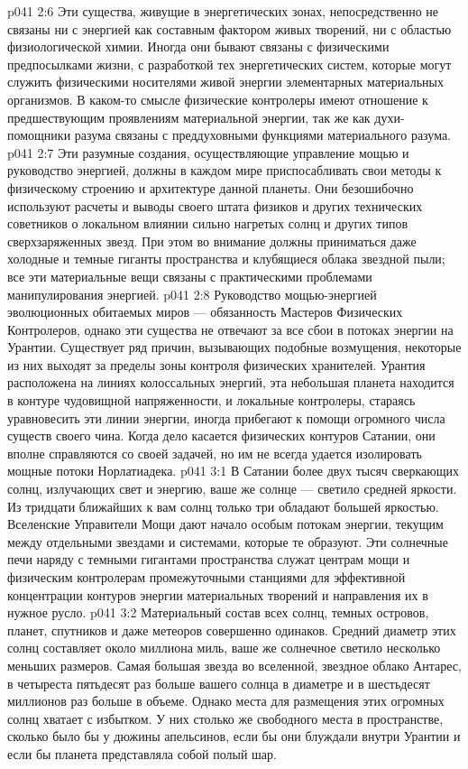 \vs p041 2:6 \pc Эти существа, живущие в энергетических зонах, непосредственно не связаны ни с энергией как составным фактором живых творений, ни с областью физиологической химии. Иногда они бывают связаны с физическими предпосылками жизни, с разработкой тех энергетических систем, которые могут служить физическими носителями живой энергии элементарных материальных организмов. В каком\hyp{}то смысле физические контролеры имеют отношение к предшествующим проявлениям материальной энергии, так же как духи\hyp{}помощники разума связаны с преддуховными функциями материального разума.
\vs p041 2:7 \pc Эти разумные создания, осуществляющие управление мощью и руководство энергией, должны в каждом мире приспосабливать свои методы к физическому строению и архитектуре данной планеты. Они безошибочно используют расчеты и выводы своего штата физиков и других технических советников о локальном влиянии сильно нагретых солнц и других типов сверхзаряженных звезд. При этом во внимание должны приниматься даже холодные и темные гиганты пространства и клубящиеся облака звездной пыли; все эти материальные вещи связаны с практическими проблемами манипулирования энергией.
\vs p041 2:8 Руководство мощью\hyp{}энергией эволюционных обитаемых миров --- обязанность Мастеров Физических Контролеров, однако эти существа не отвечают за все сбои в потоках энергии на Урантии. Существует ряд причин, вызывающих подобные возмущения, некоторые из них выходят за пределы зоны контроля физических хранителей. Урантия расположена на линиях колоссальных энергий, эта небольшая планета находится в контуре чудовищной напряженности, и локальные контролеры, стараясь уравновесить эти линии энергии, иногда прибегают к помощи огромного числа существ своего чина. Когда дело касается физических контуров Сатании, они вполне справляются со своей задачей, но им не всегда удается изолировать мощные потоки Норлатиадека.
\vs p041 3:1 В Сатании более двух тысяч сверкающих солнц, излучающих свет и энергию, ваше же солнце --- светило средней яркости. Из тридцати ближайших к вам солнц только три обладают большей яркостью. Вселенские Управители Мощи дают начало особым потокам энергии, текущим между отдельными звездами и системами, которые те образуют. Эти солнечные печи наряду с темными гигантами пространства служат центрам мощи и физическим контролерам промежуточными станциями для эффективной концентрации контуров энергии материальных творений и направления их в нужное русло.
\vs p041 3:2 Материальный состав всех солнц, темных островов, планет, спутников и даже метеоров совершенно одинаков. Средний диаметр этих солнц составляет около миллиона миль, ваше же солнечное светило несколько меньших размеров. Самая большая звезда во вселенной, звездное облако Антарес, в четыреста пятьдесят раз больше вашего солнца в диаметре и в шестьдесят миллионов раз больше в объеме. Однако места для размещения этих огромных солнц хватает с избытком. У них столько же свободного места в пространстве, сколько было бы у дюжины апельсинов, если бы они блуждали внутри Урантии и если бы планета представляла собой полый шар.
